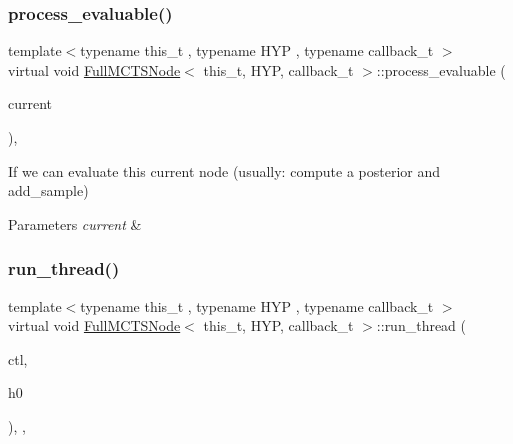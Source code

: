 \subsubsection{\texorpdfstring{process\+\_\+evaluable()}{process\_evaluable()}}
{\footnotesize\ttfamily template$<$typename this\+\_\+t , typename H\+YP , typename callback\+\_\+t $>$ \\
virtual void \hyperlink{class_full_m_c_t_s_node}{Full\+M\+C\+T\+S\+Node}$<$ this\+\_\+t, H\+YP, callback\+\_\+t $>$\+::process\+\_\+evaluable (\begin{DoxyParamCaption}\item[{H\+YP \&}]{current }\end{DoxyParamCaption})\hspace{0.3cm}{\ttfamily [inline]}, {\ttfamily [virtual]}}



If we can evaluate this current node (usually\+: compute a posterior and add\+\_\+sample) 


\begin{DoxyParams}{Parameters}
{\em current} & \\
\hline
\end{DoxyParams}
\mbox{\label{class_full_m_c_t_s_node_acfdd0747aa1af7943995436a4aae1b26}} 
\subsubsection{\texorpdfstring{run\+\_\+thread()}{run\_thread()}}
{\footnotesize\ttfamily template$<$typename this\+\_\+t , typename H\+YP , typename callback\+\_\+t $>$ \\
virtual void \hyperlink{class_full_m_c_t_s_node}{Full\+M\+C\+T\+S\+Node}$<$ this\+\_\+t, H\+YP, callback\+\_\+t $>$\+::run\+\_\+thread (\begin{DoxyParamCaption}\item[{\hyperlink{struct_control}{Control}}]{ctl,  }\item[{H\+YP}]{h0 }\end{DoxyParamCaption})\hspace{0.3cm}{\ttfamily [inline]}, {\ttfamily [override]}, {\ttfamily [virtual]}}

\mbox{\label{class_full_m_c_t_s_node_a6996a784f6674edc7ac24fbc2b94d87a}} 

